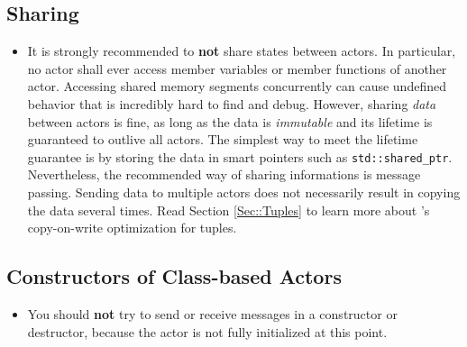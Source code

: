 \subsection{Sharing}

\begin{itemize}
\item It is strongly recommended to \textbf{not} share states between actors.
In particular, no actor shall ever access member variables or member functions of another actor.
Accessing shared memory segments concurrently can cause undefined behavior that is incredibly hard to find and debug.
However, sharing \textit{data} between actors is fine, as long as the data is \textit{immutable} and its lifetime is guaranteed to outlive all actors.
The simplest way to meet the lifetime guarantee is by storing the data in smart pointers such as \lstinline^std::shared_ptr^.
Nevertheless, the recommended way of sharing informations is message passing.
Sending data to multiple actors does not necessarily result in copying the data several times.
Read Section \ref{Sec::Tuples} to learn more about \ba's copy-on-write optimization for tuples.
\end{itemize}

\subsection{Constructors of Class-based Actors}

\begin{itemize}
\item You should \textbf{not} try to send or receive messages in a constructor or destructor, because the actor is not fully initialized at this point.
\end{itemize}

